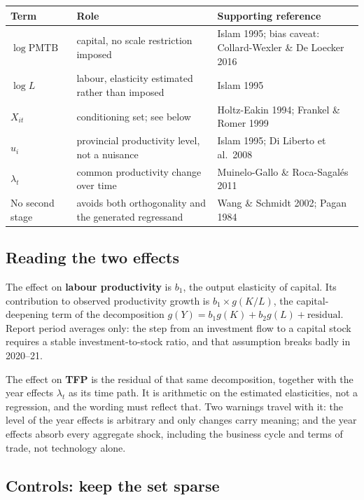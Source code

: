 \documentclass[11pt,a4paper]{article}
\begin{document}
\begin{center}
\small
\begin{tabular}{@{}p{3.3cm}p{5.8cm}p{6.6cm}@{}}
\toprule
\textbf{Term} & \textbf{Role} & \textbf{Supporting reference} \\
\midrule
$\log \mathrm{PMTB}$ & capital, no scale restriction imposed & Islam 1995; bias caveat: Collard-Wexler \& De Loecker 2016 \\
$\log L$ & labour, elasticity estimated rather than imposed & Islam 1995 \\
$X_{it}$ & conditioning set; see below & Holtz-Eakin 1994; Frankel \& Romer 1999 \\
$u_i$ & provincial productivity level, not a nuisance & Islam 1995; Di Liberto et al.\ 2008 \\
$\lambda_t$ & common productivity change over time & Muinelo-Gallo \& Roca-Sagal\'es 2011 \\
No second stage & avoids both orthogonality and the generated regressand & Wang \& Schmidt 2002; Pagan 1984 \\
\bottomrule
\end{tabular}
\end{center}

\subsection*{Reading the two effects}

The effect on \textbf{labour productivity} is $b_1$, the output elasticity of capital. Its
contribution to observed productivity growth is $b_1 \times g(K/L)$, the capital-deepening term
of the decomposition $g(Y) = b_1 g(K) + b_2 g(L) + \text{residual}$. Report period averages
only: the step from an investment flow to a capital stock requires a stable
investment-to-stock ratio, and that assumption breaks badly in 2020--21.

The effect on \textbf{TFP} is the residual of that same decomposition, together with the year
effects $\lambda_t$ as its time path. It is arithmetic on the estimated elasticities, not a
regression, and the wording must reflect that. Two warnings travel with it: the level of the
year effects is arbitrary and only changes carry meaning; and the year effects absorb every
aggregate shock, including the business cycle and terms of trade, not technology alone.

\subsection*{Controls: keep the set sparse}
\end{document}
